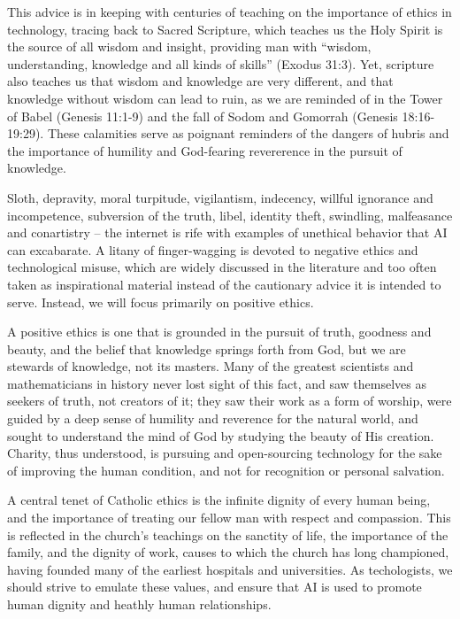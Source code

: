 \documentclass[sigplan,nonacm]{acmart}\settopmatter{printfolios=false,printccs=false,printacmref=false}
\begin{document}
  This advice is in keeping with centuries of teaching on the importance of ethics in technology, tracing back to Sacred Scripture, which teaches us the Holy Spirit is the source of all wisdom and insight, providing man with ``wisdom, understanding, knowledge and all kinds of skills'' (Exodus 31:3). Yet, scripture also teaches us that wisdom and knowledge are very different, and that knowledge without wisdom can lead to ruin, as we are reminded of in the Tower of Babel (Genesis 11:1-9) and the fall of Sodom and Gomorrah (Genesis 18:16-19:29). These calamities serve as poignant reminders of the dangers of hubris and the importance of humility and God-fearing revererence in the pursuit of knowledge.

  Sloth, depravity, moral turpitude, vigilantism, indecency, willful ignorance and incompetence, subversion of the truth, libel, identity theft, swindling, malfeasance and conartistry -- the internet is rife with examples of unethical behavior that AI can excabarate. A litany of finger-wagging is devoted to negative ethics and technological misuse, which are widely discussed in the literature and too often taken as inspirational material instead of the cautionary advice it is intended to serve. Instead, we will focus primarily on positive ethics.

  A positive ethics is one that is grounded in the pursuit of truth, goodness and beauty, and the belief that knowledge springs forth from God, but we are stewards of knowledge, not its masters. Many of the greatest scientists and mathematicians in history never lost sight of this fact, and saw themselves as seekers of truth, not creators of it; they saw their work as a form of worship, were guided by a deep sense of humility and reverence for the natural world, and sought to understand the mind of God by studying the beauty of His creation. Charity, thus understood, is pursuing and open-sourcing technology for the sake of improving the human condition, and not for recognition or personal salvation.

  A central tenet of Catholic ethics is the infinite dignity of every human being, and the importance of treating our fellow man with respect and compassion. This is reflected in the church's teachings on the sanctity of life, the importance of the family, and the dignity of work, causes to which the church has long championed, having founded many of the earliest hospitals and universities. As techologists, we should strive to emulate these values, and ensure that AI is used to promote human dignity and heathly human relationships.
\end{document}
